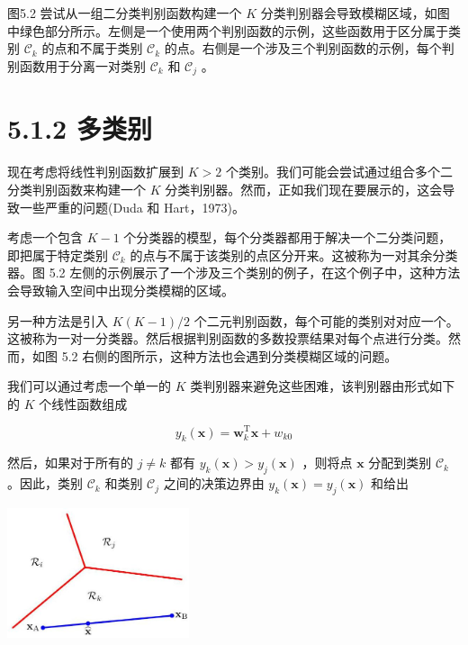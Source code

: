 \documentclass[10pt]{report}
\begin{document}
图5.2 尝试从一组二分类判别函数构建一个 \(K\) 分类判别器会导致模糊区域，如图中绿色部分所示。左侧是一个使用两个判别函数的示例，这些函数用于区分属于类别 \({\mathcal{C}}_{k}\) 的点和不属于类别 \({\mathcal{C}}_{k}\) 的点。右侧是一个涉及三个判别函数的示例，每个判别函数用于分离一对类别 \({\mathcal{C}}_{k}\) 和 \({\mathcal{C}}_{j}\) 。

\section*{5.1.2 多类别}

现在考虑将线性判别函数扩展到 \(K > 2\) 个类别。我们可能会尝试通过组合多个二分类判别函数来构建一个 \(K\) 分类判别器。然而，正如我们现在要展示的，这会导致一些严重的问题(Duda 和 Hart，1973)。

考虑一个包含 \(K - 1\) 个分类器的模型，每个分类器都用于解决一个二分类问题，即把属于特定类别 \({\mathcal{C}}_{k}\) 的点与不属于该类别的点区分开来。这被称为一对其余分类器。图 5.2 左侧的示例展示了一个涉及三个类别的例子，在这个例子中，这种方法会导致输入空间中出现分类模糊的区域。

另一种方法是引入 \(K\left( {K - 1}\right) /2\) 个二元判别函数，每个可能的类别对对应一个。这被称为一对一分类器。然后根据判别函数的多数投票结果对每个点进行分类。然而，如图 5.2 右侧的图所示，这种方法也会遇到分类模糊区域的问题。

我们可以通过考虑一个单一的 \(K\) 类判别器来避免这些困难，该判别器由形式如下的 \(K\) 个线性函数组成

\[
{y}_{k}\left( \mathbf{x}\right)  = {\mathbf{w}}_{k}^{\mathrm{T}}\mathbf{x} + {w}_{k0} \tag{5.7}
\]

然后，如果对于所有的 \(j \neq  k\) 都有 \({y}_{k}\left( \mathbf{x}\right)  > {y}_{j}\left( \mathbf{x}\right)\) ，则将点 \(\mathbf{x}\) 分配到类别 \({\mathcal{C}}_{k}\) 。因此，类别 \({\mathcal{C}}_{k}\) 和类别 \({\mathcal{C}}_{j}\) 之间的决策边界由 \({y}_{k}\left( \mathbf{x}\right)  = {y}_{j}\left( \mathbf{x}\right)\) 和给出

\begin{center}
\includegraphics[max width=0.4\textwidth]{images/0194e279-9b28-703a-88f4-c3ac21e2010d_154_1030_342_518_369_0.jpg}
\end{center}
\hspace*{3em} 
\end{document}
